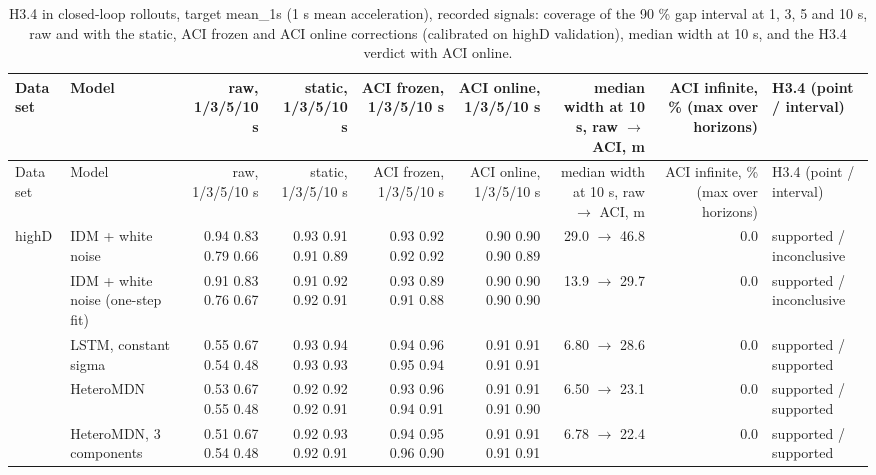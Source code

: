 \begingroup
\footnotesize
\begin{longtable}{llrrrrrrl}
\caption{H3.4 in closed-loop rollouts, target mean\_1s (1 s mean acceleration), recorded signals: coverage of the 90 \% gap interval at 1, 3, 5 and 10 s, raw and with the static, ACI frozen and ACI online corrections (calibrated on highD validation), median width at 10 s, and the H3.4 verdict with ACI online.}\label{tab:t4-coverage--raw--mean-1s} \\
\toprule
Data set & Model & raw, 1/3/5/10 s & static, 1/3/5/10 s & ACI frozen, 1/3/5/10 s & ACI online, 1/3/5/10 s & median width at 10 s, raw $\rightarrow$ ACI, m & ACI infinite, \% (max over horizons) & H3.4 (point / interval) \\
\midrule
\endfirsthead
\toprule
Data set & Model & raw, 1/3/5/10 s & static, 1/3/5/10 s & ACI frozen, 1/3/5/10 s & ACI online, 1/3/5/10 s & median width at 10 s, raw $\rightarrow$ ACI, m & ACI infinite, \% (max over horizons) & H3.4 (point / interval) \\
\midrule
\endhead
\bottomrule
\endlastfoot
highD & IDM + white noise & 0.94 0.83 0.79 0.66 & 0.93 0.91 0.91 0.89 & 0.93 0.92 0.92 0.92 & 0.90 0.90 0.90 0.89 & 29.0 $\rightarrow$ 46.8 & 0.0 & supported / inconclusive \\
 & IDM + white noise (one-step fit) & 0.91 0.83 0.76 0.67 & 0.91 0.92 0.92 0.91 & 0.93 0.89 0.91 0.88 & 0.90 0.90 0.90 0.90 & 13.9 $\rightarrow$ 29.7 & 0.0 & supported / inconclusive \\
 & LSTM, constant sigma & 0.55 0.67 0.54 0.48 & 0.93 0.94 0.93 0.93 & 0.94 0.96 0.95 0.94 & 0.91 0.91 0.91 0.91 & 6.80 $\rightarrow$ 28.6 & 0.0 & supported / supported \\
 & HeteroMDN & 0.53 0.67 0.55 0.48 & 0.92 0.92 0.92 0.91 & 0.93 0.96 0.94 0.91 & 0.91 0.91 0.91 0.90 & 6.50 $\rightarrow$ 23.1 & 0.0 & supported / supported \\
 & HeteroMDN, 3 components & 0.51 0.67 0.54 0.48 & 0.92 0.93 0.92 0.91 & 0.94 0.95 0.96 0.90 & 0.91 0.91 0.91 0.91 & 6.78 $\rightarrow$ 22.4 & 0.0 & supported / supported \\

\end{longtable}
